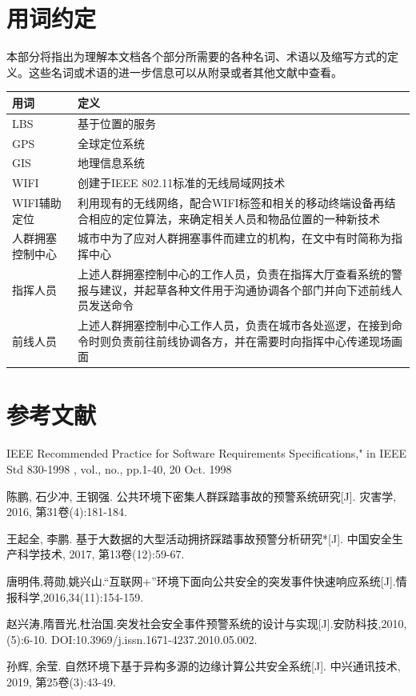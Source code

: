 \documentclass{ctexrep}
\begin{document}
\section{用词约定}
本部分将指出为理解本文档各个部分所需要的各种名词、术语以及缩写方式的定义。这些名词或术语的进一步信息可以从附录或者其他文献中查看。
\begin{longtable}{p{2cm}|p{10cm}}
\hline
用词 & 定义 \\
\hline
\hline
LBS & 基于位置的服务\\
\hline
GPS & 全球定位系统 \\
\hline
GIS & 地理信息系统 \\
\hline
WIFI & 创建于IEEE 802.11标准的无线局域网技术 \\
\hline
WIFI辅助定位 & 利用现有的无线网络，配合WIFI标签和相关的移动终端设备再结合相应的定位算法，来确定相关人员和物品位置的一种新技术 \\
\hline
人群拥塞控制中心 & 城市中为了应对人群拥塞事件而建立的机构，在文中有时简称为指挥中心\\
\hline
指挥人员 & 上述人群拥塞控制中心的工作人员，负责在指挥大厅查看系统的警报与建议，并起草各种文件用于沟通协调各个部门并向下述前线人员发送命令\\
\hline
前线人员 & 上述人群拥塞控制中心工作人员，负责在城市各处巡逻，在接到命令时则负责前往前线协调各方，并在需要时向指挥中心传递现场画面 \\
\hline
\end{longtable}
\section{参考文献}
\noindent [1] IEEE Recommended Practice for Software Requirements Specifications," in IEEE Std 830-1998 , vol., no., pp.1-40, 20 Oct. 1998

\noindent [2]陈鹏, 石少冲, 王钢强. 公共环境下密集人群踩踏事故的预警系统研究[J]. 灾害学, 2016, 第31卷(4):181-184.

\noindent [3]王起全, 李鹏. 基于大数据的大型活动拥挤踩踏事故预警分析研究*[J]. 中国安全生产科学技术, 2017, 第13卷(12):59-67.

\noindent [4]唐明伟,蒋勋,姚兴山.“互联网+”环境下面向公共安全的突发事件快速响应系统[J].情报科学,2016,34(11):154-159.


\noindent [5]赵兴涛,隋晋光,杜治国.突发社会安全事件预警系统的设计与实现[J].安防科技,2010,(5):6-10. DOI:10.3969/j.issn.1671-4237.2010.05.002.

\noindent [6]孙辉, 余莹. 自然环境下基于异构多源的边缘计算公共安全系统[J]. 中兴通讯技术, 2019, 第25卷(3):43-49.
\end{document}
